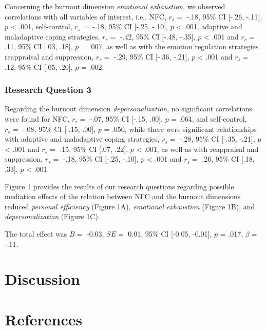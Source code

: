 \documentclass[
  man]{apa6}
\begin{document}
Concerning the burnout dimension \emph{emotional exhaustion}, we observed correlations with all variables of interest, i.e., NFC, \(r_{s}=\) -.18, 95\% CI {[}-.26, -.11{]}, \(p\) \textless{} .001, self-control, \(r_{s}=\) -.18, 95\% CI {[}-.25, -.10{]}, \(p\) \textless{} .001, adaptive and maladaptive coping strategies, \(r_{s}=\) -.42, 95\% CI {[}-.48, -.35{]}, \(p\) \textless{} .001 and \(r_{s}=\) .11, 95\% CI {[}.03, .18{]}, \(p\) = .007, as well as with the emotion regulation strategies reappraisal and suppression, \(r_{s}=\) -.29, 95\% CI {[}-.36, -.21{]}, \(p\) \textless{} .001 and \(r_{s}=\) .12, 95\% CI {[}.05, .20{]}, \(p\) = .002.

\subsubsection{Research Question 3}\label{research-question-3}

Regarding the burnout dimension \emph{depersonalization}, no significant correlations were found for NFC, \(r_{s}=\) -.07, 95\% CI {[}-.15, .00{]}, \(p\) = .064, and self-control, \(r_{s}=\) -.08, 95\% CI {[}-.15, .00{]}, \(p\) = .050, while there were significant relationships with adaptive and maladaptive coping strategies, \(r_{s}=\) -.28, 95\% CI {[}-.35, -.21{]}, \(p\) \textless{} .001 and \(r_{s}=\) .15, 95\% CI {[}.07, .22{]}, \(p\) \textless{} .001, as well as with reappraisal and suppression, \(r_{s}=\) -.18, 95\% CI {[}-.25, -.10{]}, \(p\) \textless{} .001 and \(r_{s}=\) .26, 95\% CI {[}.18, .33{]}, \(p\) \textless{} .001.

Figure 1 provides the results of our research questions regarding possible mediation effects of the relation between NFC and the burnout dimensions reduced \emph{personal efficiency} (Figure 1A), \emph{emotional exhaustion} (Figure 1B), and \emph{depersonalization} (Figure 1C).

The total effect was \(B=\) -0.03, \(SE=\) 0.01, 95\% CI {[}-0.05, -0.01{]}, \(p\) = .017, \(\beta=\) -.11.

\section{Discussion}\label{discussion}

\newpage

\section{References}\label{references}
\end{document}
